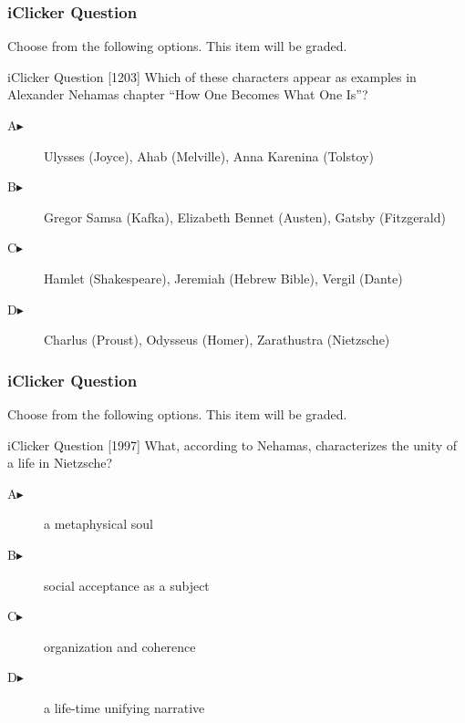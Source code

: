 \documentclass[xcolor=dvipsnames]{beamer}
\begin{document}
\begin{frame}
  \frametitle{iClicker Question}
Choose from the following options. This item will be graded.
\begin{block}{iClicker Question}
[1203] Which of these characters appear as examples in Alexander
Nehamas chapter ``How One Becomes What One Is''?
\end{block}
\begin{description}
\item[A\hspace{.2in}$\blacktriangleright$] Ulysses (Joyce), Ahab (Melville), Anna Karenina (Tolstoy)
\item[B\hspace{.2in}$\blacktriangleright$] Gregor Samsa (Kafka), Elizabeth Bennet (Austen), Gatsby (Fitzgerald)
\item[C\hspace{.2in}$\blacktriangleright$] Hamlet (Shakespeare), Jeremiah (Hebrew Bible), Vergil (Dante)
\item[D\hspace{.2in}$\blacktriangleright$] Charlus (Proust), Odysseus (Homer), Zarathustra (Nietzsche)
\end{description}
\end{frame}

\begin{frame}
  \frametitle{iClicker Question}
Choose from the following options. This item will be graded.
\begin{block}{iClicker Question}
[1997] What, according to Nehamas, characterizes the unity of a life
in Nietzsche?
\end{block}
\begin{description}
\item[A\hspace{.2in}$\blacktriangleright$] a metaphysical soul
\item[B\hspace{.2in}$\blacktriangleright$] social acceptance as a subject
\item[C\hspace{.2in}$\blacktriangleright$] organization and coherence
\item[D\hspace{.2in}$\blacktriangleright$] a life-time unifying narrative
\end{description}
\end{frame}
\end{document}
